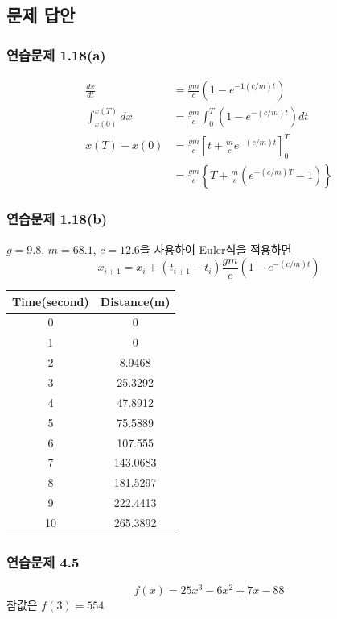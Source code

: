 \clearpage
\subsection{문제 답안}
\subsubsection{연습문제 1.18(a)}
\begin{align}
\frac{dx}{dt}&=\frac{gm}{c}\left(1-e^{-1(c/m)t}\right)\\
\int_{x(0)}^{x(T)}dx&=\frac{gm}{c}\int_{0}^{T}\left(1-e^{-(c/m)t}\right)dt\\
x(T)-x(0)&=\frac{gm}{c}\left[t+\frac{m}{c}e^{-(c/m)t}\right]_{0}^{T}\\
&=\frac{gm}{c}\left\{T+\frac{m}{c}\left(e^{-(c/m)T}-1\right)\right\}
\end{align}
\subsubsection{연습문제 1.18(b)}
$g=9.8$, $m=68.1$, $c=12.6$을 사용하여 Euler식을 적용하면
\begin{equation}
x_{i+1}=x_{i}+(t_{i+1}-t_{i})\frac{gm}{c}\left(1-e^{-(c/m)t}\right)
\end{equation}

\begin{table}[!hbpt]
\centering
\begin{tabular}{c|c}
\hline\hline
Time(second)&Distance(m)\\
\hline
0&0\\ \hline
1&0\\ \hline
2&8.9468\\ \hline
3&25.3292\\ \hline
4&47.8912\\ \hline
5&75.5889\\ \hline
6&107.555\\ \hline
7&143.0683\\ \hline
8&181.5297\\ \hline
9&222.4413\\ \hline
10&265.3892\\ \hline
\hline
\end{tabular}
\end{table}

\subsubsection{연습문제 4.5}
\begin{displaymath}
f(x)=25x^3-6x^2+7x-88
\end{displaymath}
참값은 $f(3)=554$

